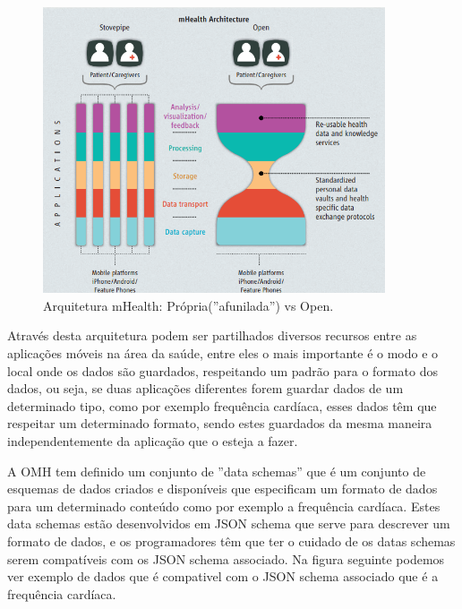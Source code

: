 \documentclass[11pt,twoside,a4paper]{report}
\begin{document}
\begin{figure}[!ht]
  \centering
  \includegraphics[width=0.9\textwidth]{imgs/openmharch.png}
  \caption[Arquitetura mHealth: Própria(''afunilada'') vs Open]{Arquitetura mHealth: Própria(''afunilada'') vs Open. \cite{omharticle}}
  
  \label{f:omharch}
\end{figure}

Através desta arquitetura podem ser partilhados diversos recursos entre as aplicações móveis na área da saúde, entre eles o mais importante é o modo e o local onde os dados são guardados, respeitando um padrão para o formato dos dados, ou seja, se duas aplicações diferentes forem guardar dados de um determinado tipo, como por exemplo frequência cardíaca, esses dados têm que respeitar um determinado formato, sendo estes guardados da mesma maneira independentemente da aplicação que o esteja a fazer.
\par 

A \gls{OMH} tem definido um conjunto de ''data schemas'' que é um conjunto de esquemas de dados criados e disponíveis que especificam um formato de dados para um determinado conteúdo como por exemplo a frequência cardíaca\cite{omhschemas}. Estes data schemas estão desenvolvidos em \gls{JSON} schema que serve para descrever um formato de dados, e os programadores têm que ter o cuidado de os datas schemas serem compatíveis com os \gls{JSON} schema associado. Na figura seguinte podemos ver exemplo de dados que é compativel com o \gls{JSON} schema associado que é a frequência cardíaca\cite{omhheartrate}.
\end{document}
